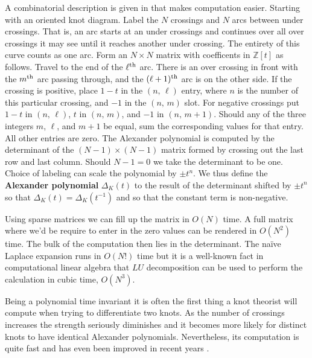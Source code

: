     A combinatorial description is given in
    \cite[p.~49]{LivingstonKnotTheory} that makes computation easier. Starting
    with an oriented knot diagram. Label the $N$ crossings and $N$ arcs
    between under crossings. That is, an arc starts at an under crossings and
    continues over all over crossings it may see until it reaches another
    under crossing. The entirety of this curve counts as one arc.
    Form an $N\times{N}$ matrix with coefficents in $\mathbb{Z}[t]$
    as follows. Travel to the end of the $\ell^{\small\textrm{th}}$ arc.
    There is an over crossing in front with the $m^{\small\textrm{th}}$
    arc passing through, and the $(\ell+1)^{\small\textrm{th}}$ arc is on the
    other side. If the crossing is positive, place $1-t$ in the
    $(n,\,\ell)$ entry, where $n$ is the number of this particular crossing,
    and $-1$ in the $(n,\,m)$ slot. For negative crossings put
    $1-t$ in $(n,\,\ell)$, $t$ in $(n,\,m)$, and
    $-1$ in $(n,\,m+1)$. Should any of the three integers $m$, $\ell$, and $m+1$
    be equal, sum the corresponding values for that entry. All other entries
    are zero. The Alexander polynomial is computed by the
    determinant of the $(N-1)\times(N-1)$ matrix formed by crossing out the
    last row and last column. Should $N-1=0$ we take the determinant to be
    one. Choice of labeling can scale the polynomial by $\pm{t}^{n}$. We thus
    define the \textbf{Alexander polynomial} $\Delta_{K}(t)$ to the result of
    the determinant shifted by $\pm{t}^{n}$ so that
    $\Delta_{K}(t)=\Delta_{K}(t^{-1})$ and so that the constant term is
    non-negative.
    \par\hfill\par
    Using sparse matrices we can fill up the matrix in $O(N)$ time. A full
    matrix where we'd be require to enter in the zero values can be rendered
    in $O(N^{2})$ time. The bulk of the computation then lies in the
    determinant. The na\"{i}ve Laplace expansion runs in $O(N!)$ time but it
    is a well-known fact in computational linear algebra that $LU$
    decomposition can be used to perform the calculation in cubic time,
    $O(N^{3})$.
    \par\hfill\par
    Being a polynomial time invariant
    it is often the first thing a knot theorist will
    compute when trying to differentiate two knots. As the number of crossings
    increases the strength seriously diminishes and it becomes more likely
    for distinct knots to have identical Alexander polynomials. Nevertheless,
    its computation is quite fast and has even been improved in recent years
    \cite{BarNatanPolynomialTimeKnotPolynomials}.

